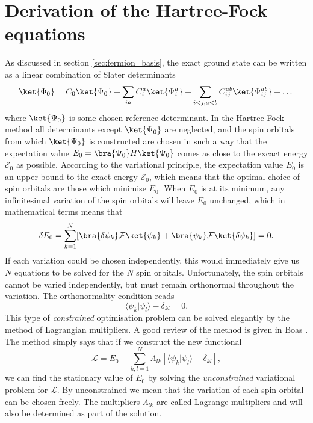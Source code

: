 \section{Derivation of the Hartree-Fock equations}
\label{sec:hartree_fock_derivation}
As discussed in section \ref{sec:fermion_basis}, the exact ground state can be written as a
linear combination of Slater determinants
\begin{equation}
 \ket{\Phi_0} = C_0\ket{\Psi_0} + \sum_{ia}C^a_i\ket{\Psi^a_i} + \sum_{i<j,a<b}C^{ab}_{ij}\ket{\Psi^{ab}_{ij}} + \dots
\end{equation}
where $\ket{\Psi_0}$ is some chosen reference determinant. In the Hartree-Fock method all determinants except $\ket{\Psi_0}$ are neglected, and the
spin orbitals from which $\ket{\Psi_0}$ is constructed are chosen in such a way that the expectation value $E_0 = \bra{\Psi_0}H\ket{\Psi_0}$ comes as
close to the excact energy $\mathscr E_0$ as possible. According to the variational principle, the expectation value $E_0$ is an upper bound
to the exact energy $\mathscr E_0$, which means that the optimal choice of spin orbitals are those which minimise $E_0$. When $E_0$ is at its minimum, any
infinitesimal variation of the spin orbitals will leave $E_0$ unchanged, which in mathematical terms means that
\begin{equation}
 \delta E_0 = \sum_{k=1}^N[\bra{\delta\psi_k}\mathcal F\ket{\psi_k} + \bra{\psi_k}\mathcal F\ket{\delta\psi_k}] = 0.
\end{equation}
If each variation could be chosen independently, this would immediately give us $N$ equations to be solved for the $N$ spin orbitals.
Unfortunately, the spin orbitals cannot be varied independently, but must remain orthonormal throughout the variation. The orthonormality condition reads
\begin{equation}
 \langle\psi_k|\psi_l\rangle - \delta_{kl} = 0.
\end{equation}
This type of \emph{constrained} optimisation problem can be solved elegantly by the method of Lagrangian multipliers. A good review of the
method is given in Boas \cite{boas2005mathematical}. The method simply says that if we construct the new functional
\begin{equation}
\label{eq:L_operator}
 \mathscr L = E_0 - \sum_{k,l=1}^N\Lambda_{lk}[\langle\psi_k|\psi_l\rangle - \delta_{kl}],
\end{equation}
we can find the stationary value of $E_0$ by solving the \emph{unconstrained} variational problem for $\mathscr L$. By unconstrained we mean that the variation
of each spin orbital can be chosen freely. The multipliers $\Lambda_{lk}$ are called Lagrange multipliers and will also be determined as part of the solution.

